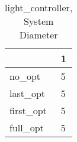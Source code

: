 \begin{table}
\caption{light\_controller, System Diameter}
\label{light_controller_diam}
\begin{tabular}{ll}
\toprule
 & 1 \\
\midrule
no\_opt & 5 \\
last\_opt & 5 \\
first\_opt & 5 \\
full\_opt & 5 \\
\bottomrule
\end{tabular}
\end{table}
